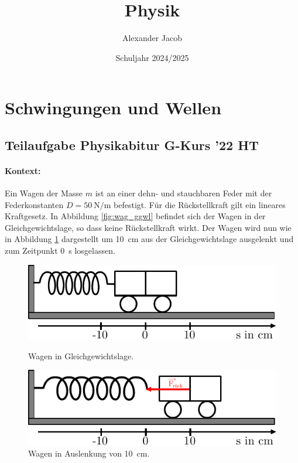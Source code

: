 \documentclass{ajc}
\title{Physik}
\author{Alexander Jacob}
\date{Schuljahr 2024/2025}
\begin{document}
	\section{Schwingungen und Wellen}
	
	\subsection{Teilaufgabe Physikabitur G-Kurs '22 HT}
	\paragraph{Kontext:}Ein Wagen der Masse $m$ ist an einer dehn- und stauchbaren Feder mit der Federkonstanten $D = \SI{50}{\newton\per\meter}$ befestigt. Für die Rückstellkraft gilt ein lineares Kraftgesetz. In Abbildung \ref{fig:wag_ggwl} befindet sich der Wagen in der Gleichgewichtslage, so dass keine Rückstellkraft wirkt. Der Wagen wird nun wie in Abbildung \ref{fig:wag_al} dargestellt um \SI{10}{\cm} aus der Gleichgewichtslage ausgelenkt und zum Zeitpunkt \SI{0}{\s} losgelassen.
	\begin{figure}[ht]
		\centering
		\begin{minipage}[b]{0.4\textwidth}
			\includegraphics[width=\textwidth]{ph_001_wagen_ggwl.pdf}
			\caption{Wagen in Gleichgewichtslage.}
			\label{fig:wag_ggwl}
		\end{minipage}
		\hfill
		\begin{minipage}[b]{0.4\textwidth}
			\includegraphics[width=\textwidth]{ph_002_wagen_al.pdf}
			\caption{Wagen in Auslenkung von \SI{10}{\cm}.}
			\label{fig:wag_al}
		\end{minipage}
	\end{figure}
\end{document}

